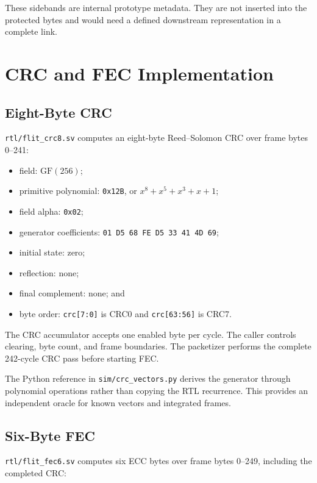 \documentclass[11pt,a4paper]{article}
\newcommand{\code}[1]{\texttt{#1}}
\newcommand{\GF}[1]{\mathrm{GF}(#1)}
\begin{document}
These sidebands are internal prototype metadata. They are not inserted into the protected
bytes and would need a defined downstream representation in a complete link.

\section{CRC and FEC Implementation}

\subsection{Eight-Byte CRC}
\code{rtl/flit\_crc8.sv} computes an eight-byte Reed--Solomon CRC over frame bytes 0--241:

\begin{itemize}[leftmargin=*]
    \item field: \(\GF{256}\);
    \item primitive polynomial: \code{0x12B}, or \(x^8+x^5+x^3+x+1\);
    \item field alpha: \code{0x02};
    \item generator coefficients: \code{01 D5 68 FE D5 33 41 4D 69};
    \item initial state: zero;
    \item reflection: none;
    \item final complement: none; and
    \item byte order: \code{crc[7:0]} is CRC0 and \code{crc[63:56]} is CRC7.
\end{itemize}

The CRC accumulator accepts one enabled byte per cycle. The caller controls clearing, byte
count, and frame boundaries. The packetizer performs the complete 242-cycle CRC pass before
starting FEC.

The Python reference in \code{sim/crc\_vectors.py} derives the generator through polynomial
operations rather than copying the RTL recurrence. This provides an independent oracle for
known vectors and integrated frames.

\subsection{Six-Byte FEC}
\code{rtl/flit\_fec6.sv} computes six ECC bytes over frame bytes 0--249, including the
completed CRC:
\end{document}
